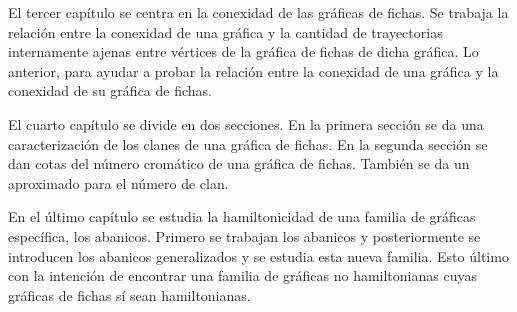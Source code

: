 El tercer cap\'itulo se centra en la conexidad de las gr\'aficas de fichas. Se
trabaja la relaci\'on entre la conexidad de una gr\'afica y la cantidad de
trayectorias internamente ajenas entre v\'ertices de la gr\'afica de fichas de
dicha gr\'afica. Lo anterior, para ayudar a probar la relaci\'on entre la
conexidad de una gr\'afica y la conexidad de su gr\'afica de fichas.

El cuarto cap\'itulo se  divide en dos secciones. En la primera secci\'on se da
una caracterizaci\'on de los clanes de una gr\'afica de fichas. En la segunda
secci\'on se dan cotas del n\'umero crom\'atico de una gr\'afica de fichas.
Tambi\'en se da un aproximado para el n\'umero de clan.

En el \'ultimo cap\'itulo se estudia la hamiltonicidad de una familia de
gr\'aficas espec\'ifica, los abanicos. Primero se trabajan los abanicos y
posteriormente se introducen los abanicos generalizados y se estudia esta nueva
familia. Esto \'ultimo con la intenci\'on de encontrar una familia de gr\'aficas
no hamiltonianas cuyas gr\'aficas de fichas s\'i sean hamiltonianas.